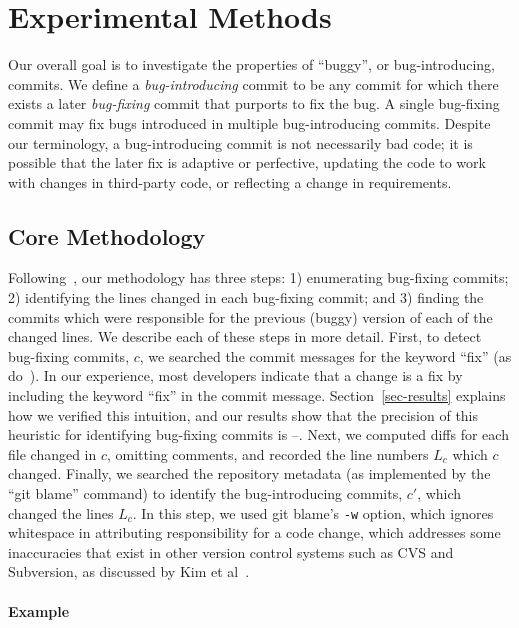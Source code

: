 \section{Experimental Methods}
\label{sec:method}

Our overall goal is to investigate the properties of ``buggy'', or
bug-introducing, commits. We define a \emph{bug-introducing} commit to be any
commit for which there exists a later \emph{bug-fixing} commit that purports to
fix the bug. A single bug-fixing commit may fix bugs introduced in multiple
bug-introducing commits. Despite our terminology, a bug-introducing commit is
not necessarily bad code; it is possible that the later fix is adaptive or
perfective, updating the code to work with changes in third-party code, or
reflecting a change in requirements.

\subsection{Core Methodology}

Following~\cite{sliwerski-msr-2005}, our methodology has three steps: 1)
enumerating bug-fixing commits; 2) identifying the lines changed in each
bug-fixing commit; and 3) finding the commits which were responsible for the
previous (buggy) version of each of the changed lines. We describe each of these
steps in more detail. First, to detect bug-fixing commits, $c$, we searched the
commit messages for the keyword ``fix'' (as do~\cite{smallCommits05}). In our
experience, most developers indicate that a change is a fix by including the
keyword ``fix'' in the commit message. Section~\ref{sec-results} explains how we
verified this intuition, and our results show that the precision of this
heuristic for identifying bug-fixing commits is \postP--\linuxP. Next, we
computed diffs for each file changed in $c$, omitting comments, and recorded the
line numbers $L_c$ which $c$ changed. Finally, we searched the repository
metadata (as implemented by the ``git blame'' command) to identify the
bug-introducing commits, $c'$, which changed the lines $L_c$. In this step, we
used git blame's {\tt -w} option, which ignores whitespace in attributing
responsibility for a code change, which addresses some inaccuracies that exist
in other version control systems such as CVS and Subversion, as discussed by Kim
et al~\cite{2006-automatic}.

\paragraph{Example}


